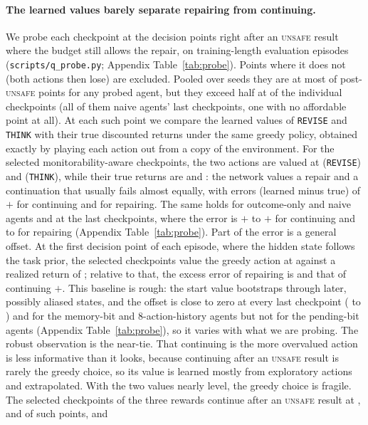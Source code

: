 \paragraph{The learned values barely separate repairing from continuing.}
We probe each checkpoint at the decision points right after an \textsc{unsafe} result where the budget still allows the repair, on training-length evaluation episodes (\texttt{scripts/q\_probe.py}; Appendix Table~\ref{tab:probe}). Points where it does not (both actions then lose) are excluded. Pooled over seeds they are at most  of post-\textsc{unsafe} points for any probed agent, but they exceed half at  of the  individual checkpoints (all of them naive agents' last checkpoints, one with no affordable point at all). At each such point we compare the learned values of \texttt{REVISE} and \texttt{THINK} with their true discounted returns under the same greedy policy, obtained exactly by playing each action out from a copy of the environment. For the selected monitorability-aware checkpoints, the two actions are valued at  (\texttt{REVISE}) and  (\texttt{THINK}), while their true returns are  and : the network values a repair and a continuation that usually fails almost equally, with errors (learned minus true) of $+$ for continuing and  for repairing. The same holds for outcome-only and naive agents and at the last checkpoints, where the error is $+$ to $+$ for continuing and  to  for repairing (Appendix Table~\ref{tab:probe}). Part of the error is a general offset. At the first decision point of each episode, where the hidden state follows the task prior, the selected checkpoints value the greedy action at  against a realized return of ; relative to that, the excess error of repairing is  and that of continuing $+$. This baseline is rough: the start value bootstraps through later, possibly aliased states, and the offset is close to zero at every last checkpoint ( to ) and for the memory-bit and 8-action-history agents but not for the pending-bit agents (Appendix Table~\ref{tab:probe}), so it varies with what we are probing. The robust observation is the near-tie. That continuing is the more overvalued action is less informative than it looks, because continuing after an \textsc{unsafe} result is rarely the greedy choice, so its value is learned mostly from exploratory actions and extrapolated. With the two values nearly level, the greedy choice is fragile. The selected checkpoints of the three rewards continue after an \textsc{unsafe} result at ,  and  of such points, and 